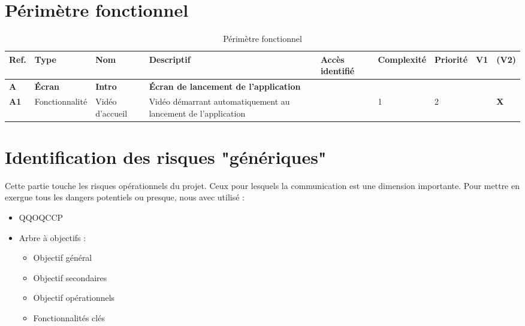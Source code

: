 \documentclass[12pt]{article}
\begin{document}
\section{Périmètre fonctionnel}
\begin{landscape}
\begin{table}[H]
\scriptsize
\caption{Périmètre fonctionnel}
\begin{tabular}{p{1cm}p{2cm}p{3cm}p{10cm}p{1.75cm}p{1.5cm}p{1.25cm}p{.5cm}p{.5cm}}
\hline  Ref.	\cellcolor{gray!25}&Type \cellcolor{gray!25}& Nom\cellcolor{gray!25}& Descriptif \cellcolor{gray!25}& \bf Accès identifié \cellcolor{gray!25} & \bf Complexité \cellcolor{gray!25} & \bf Priorité \cellcolor{gray!25} & \bf V1 \cellcolor{gray!25} & \bf (V2) \cellcolor{gray!25}\\
\hline  	\bf A\cellcolor{gray!50}& \bf Écran\cellcolor{gray!50}& \bf Intro\cellcolor{gray!50}& \bf Écran de lancement de l’application\cellcolor{gray!50}& \cellcolor{gray!50} & \cellcolor{gray!50} &  \cellcolor{gray!50} & \cellcolor{gray!50} &  \cellcolor{gray!50}\\
\hline  	\bf A1& Fonctionnalité & Vidéo d’accueil & Vidéo démarrant automatiquement au lancement de l’application &  & 1 &  2 &  & \bf X\\


\hline
\end{tabular}
\end{table}
\end{landscape}


\section{Identification des risques "génériques"}
Cette partie touche les risques opérationnels du projet. Ceux pour lesquels la communication est une dimension importante. Pour mettre en exergue tous les dangers potentiels ou presque, nous avec utilisé :
\begin{itemize}
	\item QQOQCCP
	\item Arbre à objectifs : 
		\begin{itemize}
			\item Objectif général
			\item Objectif secondaires
			\item Objectif opérationnels
			\item Fonctionnalités clés
		\end{itemize}
\end{itemize}
\end{document}
